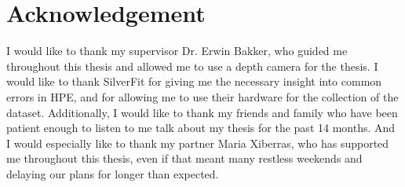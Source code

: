 \chapter*{Acknowledgement}
\label{sec:acknowledgement}
\thispagestyle{empty}

I would like to thank my supervisor Dr. Erwin Bakker, who guided me throughout this thesis and allowed me to use a depth camera for the thesis. I would like to thank SilverFit for giving me the necessary insight into common errors in HPE, and for allowing me to use their hardware for the collection of the dataset. Additionally, I would like to thank my friends and family who have been patient enough to listen to me talk about my thesis for the past 14 months. And I would especially like to thank my partner Maria Xiberras, who has supported me throughout this thesis, even if that meant many restless weekends and delaying our plans for longer than expected.

\clearpage